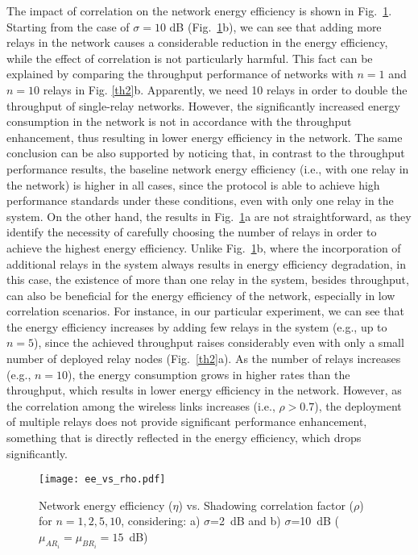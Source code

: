 \documentclass[12pt,draftcls, onecolumn]{IEEEtran}
\begin{document}
The impact of correlation on the network energy efficiency is shown in Fig.~\ref{ee2}. Starting from the case of $\sigma=10$ dB (Fig.~\ref{ee2}b), we can see that adding more relays in the network causes a considerable reduction in the energy efficiency, while the effect of correlation is not particularly harmful. This fact can be explained by comparing the throughput performance of networks with $n=1$ and $n=10$ relays in Fig. \ref{th2}b. Apparently, we need 10 relays in order to double the throughput of single-relay networks. However, the significantly increased energy consumption in the network is not in accordance with the throughput enhancement, thus resulting in lower energy efficiency in the network. The same conclusion can be also supported by noticing that, in contrast to the throughput performance results, the baseline network energy efficiency (i.e., with one relay in the network) is higher in all cases, since the protocol is able to achieve high performance standards under these conditions, even with only one relay in the system. On the other hand, the results in Fig.~\ref{ee2}a are not straightforward, as they identify the necessity of carefully choosing the number of relays in order to achieve the highest energy efficiency. Unlike Fig.~\ref{ee2}b, where the incorporation of additional relays in the system always results in energy efficiency degradation, in this case, the existence of more than one relay in the system, besides throughput, can also be beneficial for the energy efficiency of the network, especially in low correlation scenarios. For instance, in our particular experiment, we can see that the energy efficiency increases by adding few relays in the system (e.g., up to $n=5$), since the achieved throughput raises considerably even with only a small number of deployed relay nodes (Fig.~\ref{th2}a). As the number of relays increases (e.g., $n=10$), the energy consumption grows in higher rates than the throughput, which results in lower energy efficiency in the network. However, as the correlation among the wireless links increases (i.e., $\rho>0.7$), the deployment of multiple relays does not provide significant performance enhancement, something that is directly reflected in the energy efficiency, which drops significantly.

\begin{figure}[htb]
\centering
\texttt{[image: ee\_vs\_rho.pdf]}
\caption{Network energy efficiency ($\eta$) vs. Shadowing correlation factor ($\rho$) for $n=1,2,5,10$, considering: a) $\sigma$=2~dB and b) $\sigma$=10~dB ($\mu_{AR_i}=\mu_{BR_i}=15$~dB)}\label{ee2}
\end{figure}
\end{document}
